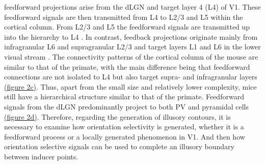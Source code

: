 \documentclass[12pt]{article}
\begin{document}
feedforward projections arise from the dLGN and target layer 4 (L4) of V1. These feedforward signals are then transmitted from L4 to L2/3 and L5 within the cortical column. From L2/3 and L5 the feedforward signals are transmitted up into the hierarchy to L4 \autocite{markovAnatomyHierarchyFeedforward2014}. In contrast, feedback projections originate mainly from infragranular L6 and supragranular L2/3 and target layers L1 and L6 in the lower visual stream \autocite{rocklandWhatWeKnow2019}. The connectivity patterns of the cortical column of the mouse are similar to that of the primate, with the main difference being that feedforward connections are not isolated to L4 but also target supra- and infragranular layers \hyperref[fig:Laminar_Figure]{(figure 2c)}. Thus, apart from the small size and relatively lower complexity, mice still have a hierarchical structure similar to that of the primate. Feedforward signals from the dLGN predominantly project to both PV and pyramidal cells \hyperref[fig:Laminar_Figure]{(figure 2d)}. Therefore, regarding the generation of illusory contours, it is necessary to examine how orientation selectivity is generated, whether it is a feedforward process or a locally generated phenomenon in V1. And then how orientation selective signals can be used to complete an illusory boundary between inducer points. 
\end{document}
